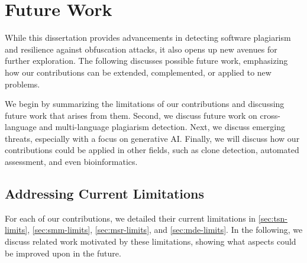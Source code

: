 \chapter{Future Work}\label{cha:future-work}
While this dissertation provides advancements in detecting software plagiarism and resilience against obfuscation attacks, it also opens up new avenues for further exploration. The following discusses possible future work, emphasizing how our contributions can be extended, complemented, or applied to new problems.

We begin by summarizing the limitations of our contributions and discussing future work that arises from them.
Second, we discuss future work on cross-language and multi-language plagiarism detection.
Next, we discuss emerging threats, especially with a focus on generative AI.
Finally, we will discuss how our contributions could be applied in other fields, such as clone detection, automated assessment, and even bioinformatics.


\section{Addressing Current Limitations}

For each of our contributions, we detailed their current limitations in \autoref{sec:tsn-limits}, \autoref{sec:smm-limits}, \autoref{sec:msr-limits}, and \autoref{sec:mde-limits}.
In the following, we discuss related work motivated by these limitations, showing what aspects could be improved upon in the future.

